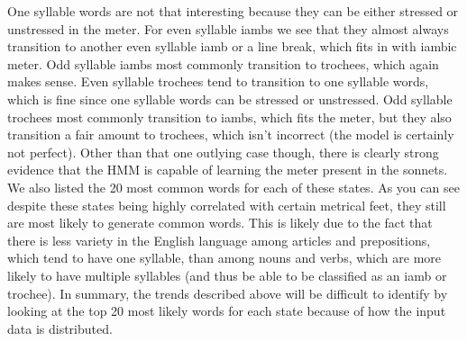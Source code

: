 \begin{itemize}
    One syllable words are not that interesting because they can be either stressed
    or unstressed in the meter. For even syllable iambs we see that they almost always
    transition to another even syllable iamb or a line break, which fits in with
    iambic meter. Odd syllable iambs most commonly transition to trochees, which
    again makes sense. Even syllable trochees tend to transition to one syllable
    words, which is fine since one syllable words can be stressed or unstressed.
    Odd syllable trochees most commonly transition to iambs, which fits the meter,
    but they also transition a fair amount to trochees, which isn't incorrect
    (the model is certainly not perfect). Other than that one outlying case though,
    there is clearly strong evidence that the HMM is capable of learning the
    meter present in the sonnets. \\

    We also listed the 20 most common words for each of these states. As you can see despite these states being highly correlated with certain metrical feet, they still are most likely to generate common words. This is likely due to
    the fact that there is less variety in the English language among articles
    and prepositions, which tend to have one syllable, than among nouns and
    verbs, which are more likely to have multiple syllables (and thus be able
    to be classified as an iamb or trochee). In summary, the trends described
    above will be difficult to identify by looking at the top 20 most likely words
    for each state because of how the input data is distributed.


\end{itemize}
